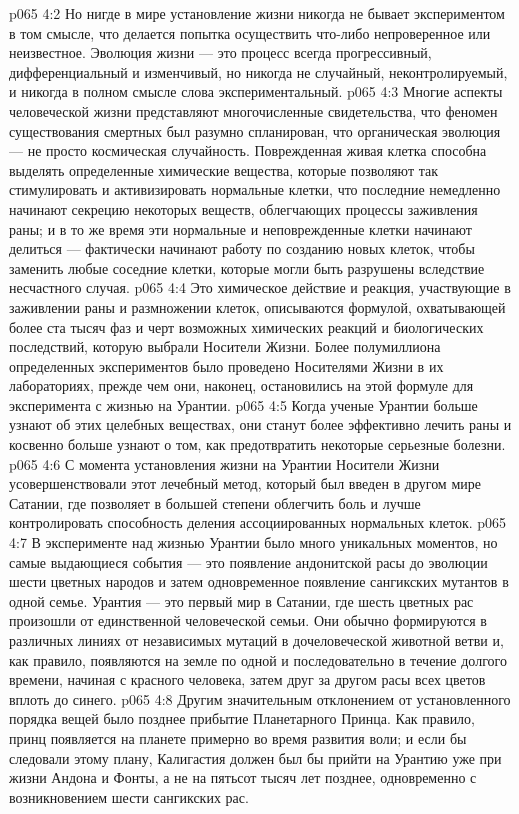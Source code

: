 \vs p065 4:2 Но нигде в мире установление жизни никогда не бывает экспериментом в том смысле, что делается попытка осуществить что\hyp{}либо непроверенное или неизвестное. Эволюция жизни --- это процесс всегда прогрессивный, дифференциальный и изменчивый, но никогда не случайный, неконтролируемый, и никогда в полном смысле слова экспериментальный.
\vs p065 4:3 \pc Многие аспекты человеческой жизни представляют многочисленные свидетельства, что феномен существования смертных был разумно спланирован, что органическая эволюция --- не просто космическая случайность. Поврежденная живая клетка способна выделять определенные химические вещества, которые позволяют так стимулировать и активизировать нормальные клетки, что последние немедленно начинают секрецию некоторых веществ, облегчающих процессы заживления раны; и в то же время эти нормальные и неповрежденные клетки начинают делиться --- фактически начинают работу по созданию новых клеток, чтобы заменить любые соседние клетки, которые могли быть разрушены вследствие несчастного случая.
\vs p065 4:4 Это химическое действие и реакция, участвующие в заживлении раны и размножении клеток, описываются формулой, охватывающей более ста тысяч фаз и черт возможных химических реакций и биологических последствий, которую выбрали Носители Жизни. Более полумиллиона определенных экспериментов было проведено Носителями Жизни в их лабораториях, прежде чем они, наконец, остановились на этой формуле для эксперимента с жизнью на Урантии.
\vs p065 4:5 Когда ученые Урантии больше узнают об этих целебных веществах, они станут более эффективно лечить раны и косвенно больше узнают о том, как предотвратить некоторые серьезные болезни.
\vs p065 4:6 С момента установления жизни на Урантии Носители Жизни усовершенствовали этот лечебный метод, который был введен в другом мире Сатании, где позволяет в большей степени облегчить боль и лучше контролировать способность деления ассоциированных нормальных клеток.
\vs p065 4:7 \pc В эксперименте над жизнью Урантии было много уникальных моментов, но самые выдающиеся события --- это появление андонитской расы до эволюции шести цветных народов и затем одновременное появление сангикских мутантов в одной семье. Урантия --- это первый мир в Сатании, где шесть цветных рас произошли от единственной человеческой семьи. Они обычно формируются в различных линиях от независимых мутаций в дочеловеческой животной ветви и, как правило, появляются на земле по одной и последовательно в течение долгого времени, начиная с красного человека, затем друг за другом расы всех цветов вплоть до синего.
\vs p065 4:8 Другим значительным отклонением от установленного порядка вещей было позднее прибытие Планетарного Принца. Как правило, принц появляется на планете примерно во время развития воли; и если бы следовали этому плану, Калигастия должен был бы прийти на Урантию уже при жизни Андона и Фонты, а не на пятьсот тысяч лет позднее, одновременно с возникновением шести сангикских рас.
